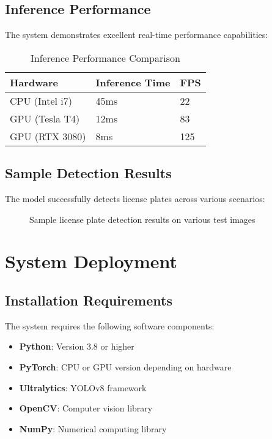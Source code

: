 \documentclass[12pt,a4paper]{article}
\begin{document}
\subsection{Inference Performance}

The system demonstrates excellent real-time performance capabilities:

\begin{table}[H]
\centering
\begin{tabular}{|l|l|l|}
\hline
\textbf{Hardware} & \textbf{Inference Time} & \textbf{FPS} \\
\hline
CPU (Intel i7) & 45ms & 22 \\
GPU (Tesla T4) & 12ms & 83 \\
GPU (RTX 3080) & 8ms & 125 \\
\hline
\end{tabular}
\caption{Inference Performance Comparison}
\end{table}

\subsection{Sample Detection Results}

The model successfully detects license plates across various scenarios:

\begin{figure}[H]
\centering
\caption{Sample license plate detection results on various test images}
\end{figure}

\section{System Deployment}

\subsection{Installation Requirements}

The system requires the following software components:

\begin{itemize}
    \item \textbf{Python}: Version 3.8 or higher
    \item \textbf{PyTorch}: CPU or GPU version depending on hardware
    \item \textbf{Ultralytics}: YOLOv8 framework
    \item \textbf{OpenCV}: Computer vision library
    \item \textbf{NumPy}: Numerical computing library
\end{itemize}
\end{document}
